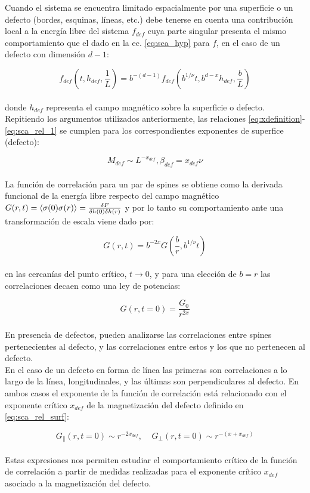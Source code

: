 Cuando el sistema se encuentra limitado espacialmente por una superficie o un defecto (bordes, esquinas, líneas, etc.) debe tenerse en cuenta
 una contribución local a la energía libre del sistema $f_{def}$ cuya parte singular presenta el mismo comportamiento que el dado en la ec. \ref{eq:sca_hyp}
 para $f$, en el caso de un defecto con dimensión $d-1$:
 
\begin{equation}
	\label{eq:sca_def}
	f_{def}(t,h_{def},\frac{1}{L})=b^{-(d-1)}f_{def}(b^{1/\nu}t,b^{d-x}h_{def},\frac{b}{L})
\end{equation}
\\
 donde $h_{def}$ representa el campo magnético sobre la superficie o defecto.\\
Repitiendo los argumentos utilizados anteriormente, las relaciones \ref{eq:xdefinition}-\ref{eq:sca_rel_1} se cumplen para
 los correspondientes exponentes de superfice (defecto):
 
\begin{equation}
	\label{eq:sca_rel_surf}
	M_{def}\sim L^{-x_{def}}, \beta_{def} =x_{def}\nu
\end{equation}
\\
La funci\'on de correlaci\'on para un par de spines se obtiene como la derivada funcional de la energ\'ia libre respecto del campo magn\'etico 
 $G(r,t)=\langle \sigma(0)\sigma(r) \rangle=\frac{\delta F}{\delta h(0) \delta h(r)}$ y por lo tanto su comportamiento ante una
 transformaci\'on de escala viene dado por:
 
\begin{equation}
	\label{eq:sca_corr}
	G(r, t)=b^{-2x}G(\frac{b}{r}, b^{1/\nu}t)
\end{equation}
\\
 en las cercan\'ias del punto cr\'itico, $t\rightarrow 0$, y para una elecci\'on de $b=r$ las correlaciones decaen como
 una ley de potencias:

\begin{equation}
	\label{eq:sca_corr_pot}
	G(r, t=0)=\frac{G_{0}}{r^{2x}}
\end{equation}
\\
En presencia de defectos, pueden analizarse las correlaciones entre spines pertenecientes al defecto, y las
 correlaciones entre estos y los que no pertenecen al defecto.\\
En el caso de un defecto en forma de l\'inea las primeras
 son correlaciones a lo largo de la l\'inea, longitudinales, y las \'ultimas son perpendiculares al defecto. En ambos casos
 el exponente de la funci\'on de correlaci\'on est\'a relacionado con el exponente cr\'itico $x_{def}$ de la magnetizaci\'on
 del defecto definido en \ref{eq:sca_rel_surf}:

\begin{equation}
	\label{eq:sca_corr_pot_def}
	G_{\parallel}(r, t=0)\sim{r^{-2x_{def}}}, \; \; \; \;  G_{\perp}(r, t=0)\sim{r^{-(x+x_{def})}}
\end{equation}
\\

Estas expresiones nos permiten estudiar el comportamiento cr\'itico de la funci\'on de correlaci\'on a partir
 de medidas realizadas para el exponente cr\'itico $x_{def}$ asociado a la magnetizaci\'on del defecto.\\

